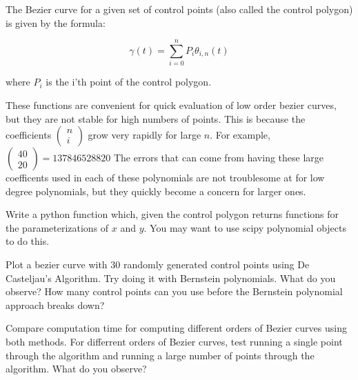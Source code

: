 The Bezier curve for a given set of control points (also called the control polygon) is given by the formula:

$$\gamma (t) = \sum_{i=0}^n P_i \theta_{i,n} (t)$$ 

where $P_i$ is the i'th point of the control polygon.

These functions are convenient for quick evaluation of low order bezier curves, but they are not stable for high numbers of points. This is because the coefficients $\left( \begin{smallmatrix} n\\ i \end{smallmatrix} \right)$ grow very rapidly for large $n$. For example, $\left( \begin{smallmatrix} 40\\ 20 \end{smallmatrix} \right)=137846528820$ The errors that can come from having these large coefficents used in each of these polynomials are not troublesome at for low degree polynomials, but they quickly become a concern for larger ones. 

\begin{problem}
Write a python function which, given the control polygon returns functions for the parameterizations of $x$ and $y$. You may want to use scipy polynomial objects to do this.
\end{problem}

\begin{problem}
Plot a bezier curve with 30 randomly generated control points using De Casteljau's Algorithm. Try doing it with Bernstein polynomials. What do you observe? How many control points can you use before the Bernstein polynomial approach breaks down?
\end{problem}

\begin{problem}
Compare computation time for computing different orders of Bezier curves using both methods. For differrent orders of Bezier curves, test running a single point through the algorithm and running a large number of points through the algorithm. What do you observe?
\end{problem}


